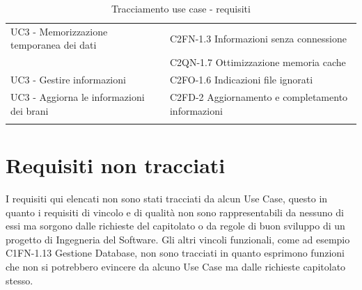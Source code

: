 \begin{footnotesize}
\begin{longtable}[!h]{|l|l|}
UC3 - Memorizzazione temporanea dei dati & C2FN-1.3 Informazioni senza
connessione \\
 & C2QN-1.7 Ottimizzazione memoria cache \\ \hline
UC3 - Gestire informazioni & C2FO-1.6 Indicazioni file ignorati \\ \hline
UC3 - Aggiorna le informazioni dei brani & C2FD-2 Aggiornamento e completamento
informazioni \\ \hline
\caption{Tracciamento use case - requisiti}
\end{longtable}
\end{footnotesize}

\newpage
\section{Requisiti non tracciati}

I requisiti qui elencati non sono stati tracciati da alcun Use Case, questo in
quanto i requisiti di vincolo e di qualit\`a non sono rappresentabili da nessuno
di essi ma sorgono dalle richieste del capitolato o da regole di buon sviluppo
di un progetto di Ingegneria del Software.
Gli altri vincoli funzionali, come ad esempio C1FN-1.13 Gestione Database, non sono
tracciati in quanto esprimono funzioni che non si potrebbero evincere da alcuno Use
Case ma dalle richieste capitolato stesso.


